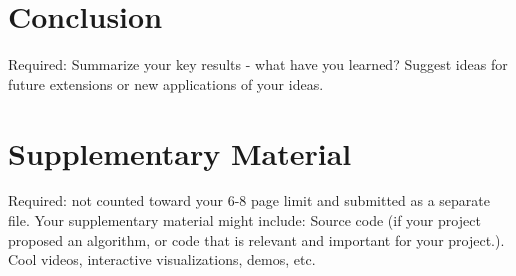 \documentclass[10pt,twocolumn,letterpaper]{article}
\begin{document}
\section{Conclusion}
Required: Summarize your key results - what have you learned? 
Suggest ideas for future extensions or new applications of your ideas.

\section{Supplementary Material}
Required: not counted toward your 6-8 page limit and submitted as a separate file. Your supplementary material might include:
Source code (if your project proposed an algorithm, or code that is relevant and important for your project.).
Cool videos, interactive visualizations, demos, etc.

{
    \small
    
    
}
\end{document}
